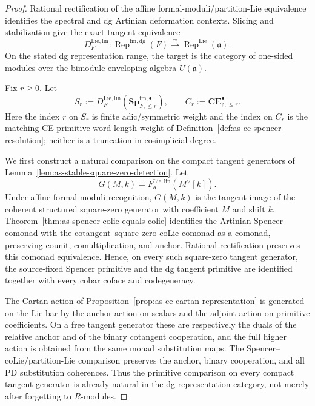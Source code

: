 \begin{proof}
Rational rectification of the affine formal-moduli/partition-Lie equivalence
identifies the spectral and dg Artinian deformation contexts.  Slicing and
stabilization give the exact tangent equivalence
\[
    D_F^{\mathrm{Lie,lin}}:
    \operatorname{Rep}^{\mathrm{fm,dg}}(F)
    \xrightarrow{\sim}
    \operatorname{Rep}^{\mathrm{Lie}}(\mathfrak a).
\]
On the stated dg representation range, the target is the category of
one-sided modules over the bimodule enveloping algebra $U(\mathfrak a)$.

Fix $r\geq0$.  Let
\[
    S_r
    :=
    D_F^{\mathrm{Lie,lin}}
    \left(
        \mathbf{Sp}^{\mathrm{fm},\bullet}_{F,\le r}
    \right),
    \qquad
    C_r
    :=
    \mathbf{CE}^{\bullet}_{\mathfrak a,\le r}.
\]
Here the index $r$ on $S_r$ is finite adic/symmetric weight and the index on
$C_r$ is the matching CE primitive-word-length weight of
Definition~\ref{def:as-ce-spencer-resolution}; neither is a truncation in
cosimplicial degree.

We first construct a natural comparison on the compact tangent generators of
Lemma~\ref{lem:as-stable-square-zero-detection}.  Let
\[
    G(M,k)
    =
    F_{\mathfrak a}^{\mathrm{Lie,lin}}(M^\vee[k]).
\]
Under affine formal-moduli recognition, $G(M,k)$ is the tangent image of the
coherent structured square-zero generator with coefficient $M$ and shift
$k$.  Theorem~\ref{thm:as-spencer-colie-equals-colie} identifies the
Artinian Spencer comonad with the cotangent--square-zero coLie comonad as a
comonad, preserving counit, comultiplication, and anchor.  Rational
rectification preserves this comonad equivalence.  Hence, on every such
square-zero tangent generator, the source-fixed Spencer primitive and the dg
tangent primitive are identified together with every cobar coface and
codegeneracy.

The Cartan action of
Proposition~\ref{prop:as-ce-cartan-representation} is generated on the Lie
bar by the anchor action on scalars and the adjoint action on primitive
coefficients.  On a free tangent generator these are respectively the duals
of the relative anchor and of the binary cotangent cooperation, and the full
higher action is obtained from the same monad substitution maps.  The
Spencer--coLie/partition-Lie comparison preserves the anchor, binary
cooperation, and all PD substitution coherences.  Thus the primitive
comparison on every compact tangent generator is already natural in the dg
representation category, not merely after forgetting to $R$-modules.


\end{proof}
